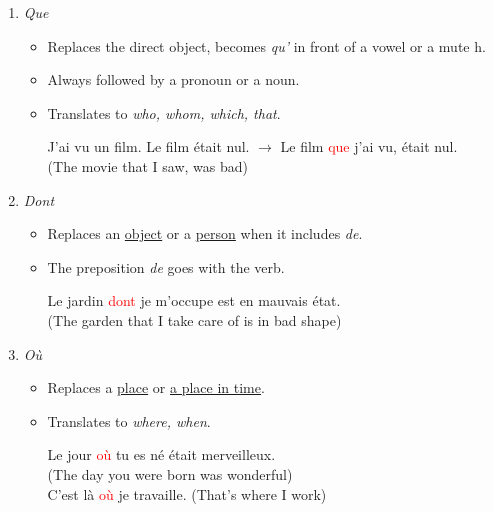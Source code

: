 \documentclass{book}
\begin{document}
\begin{enumerate}
            \item \textit{Que}
                \begin{itemize}
                    \item Replaces the direct object, becomes \textit{qu'} in front of a vowel or a mute h. 
                    \item Always followed by a pronoun or a noun.
                    \item Translates to \textit{who, whom, which, that}.
                        \begin{center}
                            J'ai vu un film. Le film était nul.
                            $\to$ Le film \textcolor{red}{que} j'ai vu, était nul. \\
                            (The movie that I saw, was bad)
                        \end{center}
                \end{itemize}

            \item \textit{Dont}
                \begin{itemize}
                    \item Replaces an \underline{object} or a \underline{person} when it includes \textit{de}. 
                    \item The preposition \textit{de} goes with the verb.
                        \begin{center}
                            Le jardin \textcolor{red}{dont} je m'occupe est en mauvais état. \\
                            (The garden that I take care of is in bad shape) 
                        \end{center}
                \end{itemize}

            \item \textit{Où}
                \begin{itemize}
                    \item Replaces a \underline{place} or \underline{a place in time}.
                    \item Translates to \textit{where, when}.
                        \begin{center}
                            Le jour \textcolor{red}{où} tu es né était merveilleux. \\
                            (The day you were born was wonderful) \\
                            C'est là \textcolor{red}{où} je travaille. (That's where I work)
                        \end{center}
                \end{itemize}


\end{enumerate}
\end{document}
